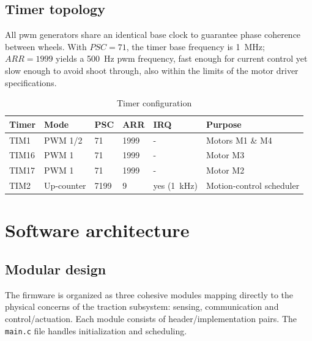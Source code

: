 \subsection{Timer topology}

All \gls{pwm} generators share an identical base clock to guarantee phase coherence between wheels. With $PSC = 71$, the timer base frequency is \SI{1}{\MHz}; $ARR = 1999$ yields a \SI{500}{\Hz} \gls{pwm} frequency, fast enough for current control yet slow enough to avoid shoot through, also within the limits of the motor driver specifications.

\begin{table}[H]
  \centering
  \begin{tabular}{@{}llllll@{}}
    \toprule
    \textbf{Timer} & \textbf{Mode} & \textbf{PSC} & \textbf{ARR} & \textbf{IRQ}       & \textbf{Purpose}         \\
    \midrule
    TIM1           & PWM 1/2       & 71           & 1999         & -                  & Motors M1 \& M4          \\
    TIM16          & PWM 1         & 71           & 1999         & -                  & Motor M3                 \\
    TIM17          & PWM 1         & 71           & 1999         & -                  & Motor M2                 \\
    TIM2           & Up-counter    & 7199         & 9            & yes (\SI{1}{\kHz}) & Motion-control scheduler \\
    \bottomrule
  \end{tabular}
  \caption{Timer configuration}
\end{table}

\section{Software architecture}

\subsection{Modular design}

The firmware is organized as three cohesive modules mapping directly to the physical concerns of the traction subsystem: sensing, communication and control/actuation. Each module consists of header/implementation pairs. The \texttt{main.c} file handles initialization and scheduling.

